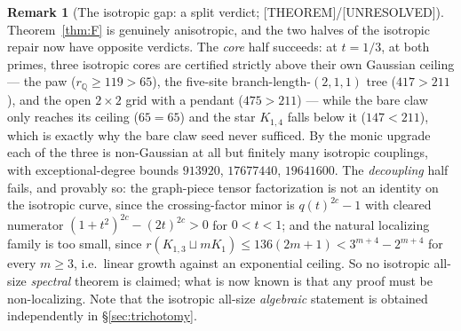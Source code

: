 \documentclass[11pt]{article}
\theoremstyle{definition}
\newtheorem{remark}[theorem]{Remark}
\newcommand{\Qb}{\mathbb{Q}}
\begin{document}
\begin{remark}[The isotropic gap: a split verdict; {[THEOREM]}/{[UNRESOLVED]}]
Theorem~\ref{thm:F} is genuinely anisotropic, and the two halves of the isotropic repair now have
opposite verdicts. The \emph{core} half succeeds: at $t=1/3$, at both primes, three isotropic cores
are certified strictly above their own Gaussian ceiling --- the paw ($r_\Qb\ge119>65$), the five-site
branch-length-$(2,1,1)$ tree ($417>211$), and the open $2\times2$ grid with a pendant ($475>211$)
--- while the bare claw only reaches its ceiling ($65=65$) and the star $K_{1,4}$ falls below it
($147<211$), which is exactly why the bare claw seed never sufficed. By the monic upgrade each of
the three is non-Gaussian at all but finitely many isotropic couplings, with exceptional-degree
bounds $913920$, $17677440$, $19641600$. The \emph{decoupling} half fails, and provably so: the
graph-piece tensor factorization is not an identity on the isotropic curve, since the crossing-factor
minor is $q(t)^{2c}-1$ with cleared numerator $(1+t^2)^{2c}-(2t)^{2c}>0$ for $0<t<1$; and the natural
localizing family is too small, since $r(K_{1,3}\sqcup mK_1)\le136(2m+1)<3^{m+4}-2^{m+4}$ for every
$m\ge3$, i.e.\ linear growth against an exponential ceiling. So no isotropic all-size \emph{spectral}
theorem is claimed; what is now known is that any proof must be non-localizing. Note that the
isotropic all-size \emph{algebraic} statement is obtained independently in
\S\ref{sec:trichotomy}.
\end{remark}
\end{document}
